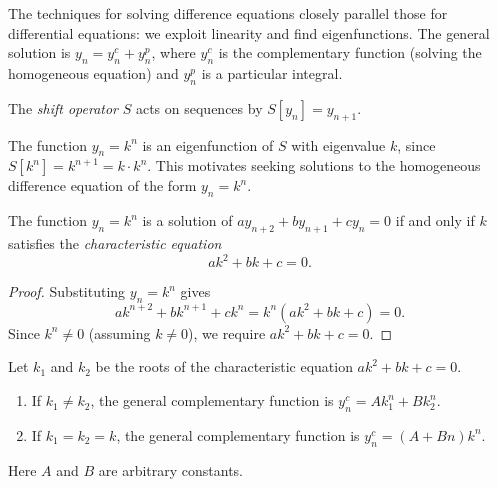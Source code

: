 \documentclass[a4paper]{article}
\begin{document}
\begin{remark}
  The techniques for solving difference equations closely parallel those for differential equations: we exploit linearity and find eigenfunctions. The general solution is $y_n = y_n^c + y_n^p$, where $y_n^c$ is the complementary function (solving the homogeneous equation) and $y_n^p$ is a particular integral.
\end{remark}

\begin{defi}
  The \emph{shift operator} $S$ acts on sequences by $S[y_n] = y_{n+1}$.
\end{defi}

\begin{remark}
  The function $y_n = k^n$ is an eigenfunction of $S$ with eigenvalue $k$, since $S[k^n] = k^{n+1} = k \cdot k^n$. This motivates seeking solutions to the homogeneous difference equation of the form $y_n = k^n$.
\end{remark}

\begin{prop}
  The function $y_n = k^n$ is a solution of $ay_{n+2} + by_{n+1} + cy_n = 0$ if and only if $k$ satisfies the \emph{characteristic equation}
  \[
    ak^2 + bk + c = 0.
  \]
\end{prop}
\begin{proof}
  Substituting $y_n = k^n$ gives
  \[
    ak^{n+2} + bk^{n+1} + ck^n = k^n(ak^2 + bk + c) = 0.
  \]
  Since $k^n \neq 0$ (assuming $k \neq 0$), we require $ak^2 + bk + c = 0$.
\end{proof}

\begin{prop}
  Let $k_1$ and $k_2$ be the roots of the characteristic equation $ak^2 + bk + c = 0$.
  \begin{enumerate}
    \item If $k_1 \neq k_2$, the general complementary function is $y_n^c = Ak_1^n + Bk_2^n$.
    \item If $k_1 = k_2 = k$, the general complementary function is $y_n^c = (A + Bn)k^n$.
  \end{enumerate}
  Here $A$ and $B$ are arbitrary constants.
\end{prop}
\end{document}
